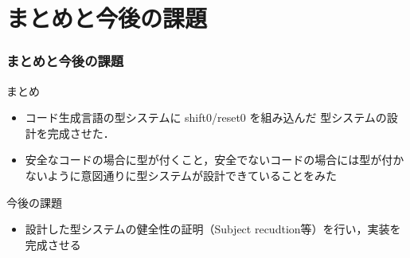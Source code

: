 \section{まとめと今後の課題}

\begin{frame}
  \frametitle{まとめと今後の課題}
  まとめ
  \begin{itemize}
  \item コード生成言語の型システムに shift0/reset0 を組み込んだ 型システムの設計を完成させた．
  \item 安全なコードの場合に型が付くこと，安全でないコードの場合には型が付かないように意図通りに型システムが設計できていることをみた
  \end{itemize}

  \vspace{\baselineskip}

  今後の課題
  \begin{itemize}
  \item 設計した型システムの健全性の証明（Subject recudtion等）を行い，実装を完成させる
  \end{itemize}
\end{frame}


